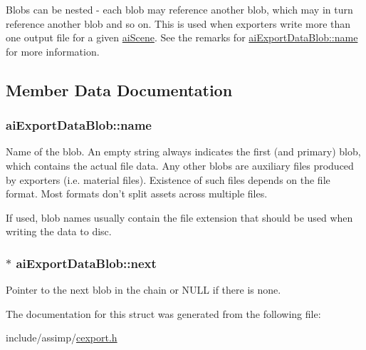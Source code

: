 \-Blobs can be nested -\/ each blob may reference another blob, which may in turn reference another blob and so on. \-This is used when exporters write more than one output file for a given \hyperlink{structaiScene}{ai\-Scene}. \-See the remarks for \hyperlink{structaiExportDataBlob_a22fbdb28a7ebc30b4d3c3339be18b5f2}{ai\-Export\-Data\-Blob\-::name} for more information. 

\subsection{\-Member \-Data \-Documentation}
\hypertarget{structaiExportDataBlob_a22fbdb28a7ebc30b4d3c3339be18b5f2}{
\subsubsection[{name}]{ {\bf ai\-Export\-Data\-Blob\-::name}}}\label{structaiExportDataBlob_a22fbdb28a7ebc30b4d3c3339be18b5f2}
\-Name of the blob. \-An empty string always indicates the first (and primary) blob, which contains the actual file data. \-Any other blobs are auxiliary files produced by exporters (i.\-e. material files). \-Existence of such files depends on the file format. \-Most formats don't split assets across multiple files.

\-If used, blob names usually contain the file extension that should be used when writing the data to disc. \hypertarget{structaiExportDataBlob_a73baa3d77f95f360540b0b1922075ba5}{
\subsubsection[{next}]{$\ast$ {\bf ai\-Export\-Data\-Blob\-::next}}}\label{structaiExportDataBlob_a73baa3d77f95f360540b0b1922075ba5}
\-Pointer to the next blob in the chain or \-N\-U\-L\-L if there is none. 

\-The documentation for this struct was generated from the following file\-:\begin{DoxyCompactItemize}
\item 
include/assimp/\hyperlink{cexport_8h}{cexport.\-h}\end{DoxyCompactItemize}

